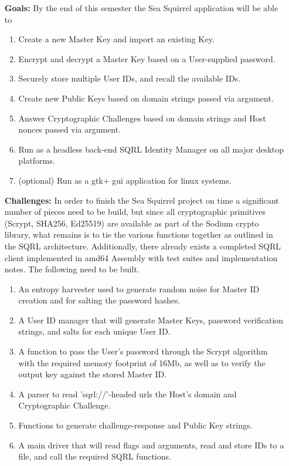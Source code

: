 \documentclass[12pt,twoside]{article}
\begin{document}
\begin{enumerate}
	\item[\textbf{Goals:}] By the end of this semester the Sea Squirrel application will be able to
	\begin{enumerate}
		\item Create a new Master Key and import an existing Key.
		\item Encrypt and decrypt a Master Key based on a User-supplied password.
		\item Securely store multiple User IDs, and recall the available IDs.
		\item Create new Public Keys based on domain strings passed via argument.
		\item Answer Cryptographic Challenges based on domain strings and Host nonces passed via argument.
		\item Run as a headless back-end SQRL Identity Manager on all major desktop platforms.
		\item (optional) Run as a gtk+ gui application for linux systems.
	\end{enumerate}
	
	\item[\textbf{Challenges:}] In order to finish the Sea Squirrel project on time a significant number of pieces need to be build, but since all cryptographic primitives (Scrypt, SHA256, Ed25519) are available as part of the Sodium crypto library, what remains is to tie the various functions together as outlined in the SQRL architecture. Additionally, there already exists a completed SQRL client implemented in amd64 Assembly with test suites and implementation notes. The following need to be built.
	\begin{enumerate}
		\item An entropy harvester used to generate random noise for Master ID creation and for salting the password hashes.
		\item A User ID manager that will generate Master Keys, password verification strings, and salts for each unique User ID.
		\item A function to pass the User's password through the Scrypt algorithm with the required memory footprint of 16Mb, as well as to verify the output key against the stored Master ID.
		\item A parser to read 'sqrl://'-headed urls the Host's domain and Cryptographic Challenge.
		\item Functions to generate challenge-response and Public Key strings.
		\item A main driver that will read flags and arguments, read and store IDs to a file, and call the required SQRL functions.
	\end{enumerate}
	
\end{enumerate}

\nocite{*}	%


\end{document}
